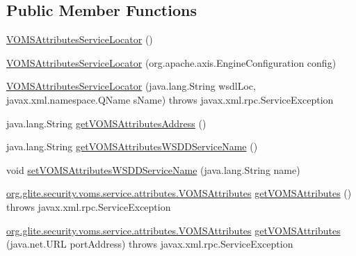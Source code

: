 \subsection*{Public Member Functions}
\begin{DoxyCompactItemize}
\item 
\hyperlink{classorg_1_1glite_1_1security_1_1voms_1_1service_1_1attributes_1_1VOMSAttributesServiceLocator_aa76d54168cfd35c57729b7db8a27718f}{VOMSAttributesServiceLocator} ()
\item 
\hyperlink{classorg_1_1glite_1_1security_1_1voms_1_1service_1_1attributes_1_1VOMSAttributesServiceLocator_aa209904a1f40577e3bec31bea04ce8a5}{VOMSAttributesServiceLocator} (org.apache.axis.EngineConfiguration config)
\item 
\hyperlink{classorg_1_1glite_1_1security_1_1voms_1_1service_1_1attributes_1_1VOMSAttributesServiceLocator_a5fa391763b690b4d9e46897ddaf4b443}{VOMSAttributesServiceLocator} (java.lang.String wsdlLoc, javax.xml.namespace.QName sName)  throws javax.xml.rpc.ServiceException 
\item 
java.lang.String \hyperlink{classorg_1_1glite_1_1security_1_1voms_1_1service_1_1attributes_1_1VOMSAttributesServiceLocator_a76fb084ac841fa506ce6b4386efc79fc}{getVOMSAttributesAddress} ()
\item 
java.lang.String \hyperlink{classorg_1_1glite_1_1security_1_1voms_1_1service_1_1attributes_1_1VOMSAttributesServiceLocator_a8e08dc861cc2e78e50f4bbc0cdac0ad0}{getVOMSAttributesWSDDServiceName} ()
\item 
void \hyperlink{classorg_1_1glite_1_1security_1_1voms_1_1service_1_1attributes_1_1VOMSAttributesServiceLocator_a9d55612583becdeb73b9d80d37947627}{setVOMSAttributesWSDDServiceName} (java.lang.String name)
\item 
\hyperlink{interfaceorg_1_1glite_1_1security_1_1voms_1_1service_1_1attributes_1_1VOMSAttributes}{org.glite.security.voms.service.attributes.VOMSAttributes} \hyperlink{classorg_1_1glite_1_1security_1_1voms_1_1service_1_1attributes_1_1VOMSAttributesServiceLocator_a981a432f1407ace3c240c9c7b2d1f909}{getVOMSAttributes} ()  throws javax.xml.rpc.ServiceException 
\item 
\hyperlink{interfaceorg_1_1glite_1_1security_1_1voms_1_1service_1_1attributes_1_1VOMSAttributes}{org.glite.security.voms.service.attributes.VOMSAttributes} \hyperlink{classorg_1_1glite_1_1security_1_1voms_1_1service_1_1attributes_1_1VOMSAttributesServiceLocator_a9d3db6a1afcd41087cb93ca2ed8683c8}{getVOMSAttributes} (java.net.URL portAddress)  throws javax.xml.rpc.ServiceException 

\end{DoxyCompactItemize}
